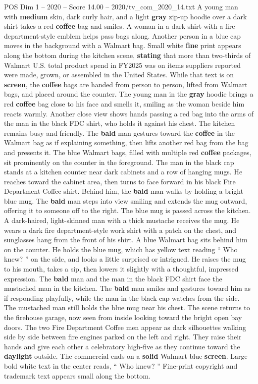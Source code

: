\begin{textsample}{POS Dim 1 – 2020 – Score 14.00 – 2020/tv\_com\_2020\_14.txt}
A young man with \textbf{medium} skin, dark curly hair, and a light \textbf{gray} zip-up hoodie over a dark shirt takes a red \textbf{coffee} bag and smiles.
A woman in a dark shirt with a fire department-style emblem helps pass bags along.
Another person in a blue cap moves in the background with a Walmart bag.
Small white \textbf{fine} print appears along the bottom during the kitchen scene, \textbf{stating} that more than two-thirds of Walmart U.S. total product spend in FY2025 was on items suppliers reported were made, grown, or assembled in the United States.
While that text is on \textbf{screen}, the \textbf{coffee} bags are handed from person to person, lifted from Walmart bags, and placed around the counter.
The young man in the \textbf{gray} hoodie brings a red \textbf{coffee} bag close to his face and smells it, smiling as the woman beside him reacts warmly.
Another close view shows hands passing a red bag into the arms of the man in the black FDC shirt, who holds it against his chest.
The kitchen remains busy and friendly.
The \textbf{bald} man gestures toward the \textbf{coffee} in the Walmart bag as if explaining something, then lifts another red bag from the bag and presents it.
The blue Walmart bags, filled with multiple red \textbf{coffee} packages, sit prominently on the counter in the foreground.
The man in the black cap stands at a kitchen counter near dark cabinets and a row of hanging mugs.
He reaches toward the cabinet area, then turns to face forward in his black Fire Department Coffee shirt.
Behind him, the \textbf{bald} man walks by holding a bright blue mug.
The \textbf{bald} man steps into view smiling and extends the mug outward, offering it to someone off to the right.
The blue mug is passed across the kitchen.
A dark-haired, light-skinned man with a thick mustache receives the mug.
He wears a dark fire department-style work shirt with a patch on the chest, and sunglasses hang from the front of his shirt.
A blue Walmart bag sits behind him on the counter.
He holds the blue mug, which has yellow text reading “ Who knew? ” on the side, and looks a little surprised or intrigued.
He raises the mug to his mouth, takes a sip, then lowers it slightly with a thoughtful, impressed expression.
The \textbf{bald} man and the man in the black FDC shirt face the mustached man in the kitchen.
The \textbf{bald} man smiles and gestures toward him as if responding playfully, while the man in the black cap watches from the side.
The mustached man still holds the blue mug near his chest.
The scene returns to the firehouse garage, now seen from inside looking toward the bright open bay doors.
The two Fire Department Coffee men appear as dark silhouettes walking side by side between fire engines parked on the left and right.
They raise their hands and give each other a celebratory high-five as they continue toward the \textbf{daylight} outside.
The commercial ends on a \textbf{solid} Walmart-blue \textbf{screen}.
Large bold white text in the center reads, “ Who knew? ” Fine-print copyright and trademark text appears small along the bottom.

\end{textsample}
